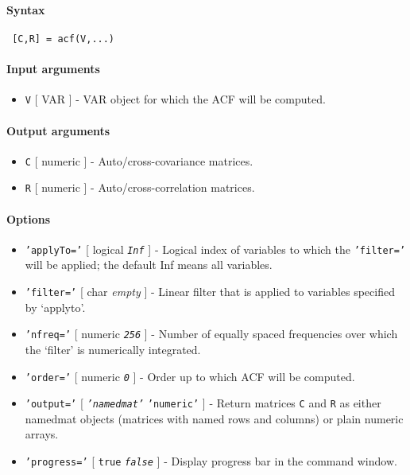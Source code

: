 


	\paragraph{Syntax}
 
 \begin{verbatim}
 [C,R] = acf(V,...)
 \end{verbatim}
 
 \paragraph{Input arguments}
 
 \begin{itemize}
 \item
   \texttt{V} {[} VAR {]} - VAR object for which the ACF will be
   computed.
 \end{itemize}
 
 \paragraph{Output arguments}
 
 \begin{itemize}
 \item
   \texttt{C} {[} numeric {]} - Auto/cross-covariance matrices.
 \item
   \texttt{R} {[} numeric {]} - Auto/cross-correlation matrices.
 \end{itemize}
 
 \paragraph{Options}
 
 \begin{itemize}
 \item
   \texttt{'applyTo='} {[} logical \textbar{} \emph{\texttt{Inf}} {]} -
   Logical index of variables to which the \texttt{'filter='} will be
   applied; the default Inf means all variables.
 \item
   \texttt{'filter='} {[} char \textbar{} \emph{empty} {]} - Linear
   filter that is applied to variables specified by `applyto'.
 \item
   \texttt{'nfreq='} {[} numeric \textbar{} \emph{\texttt{256}} {]} -
   Number of equally spaced frequencies over which the `filter' is
   numerically integrated.
 \item
   \texttt{'order='} {[} numeric \textbar{} \emph{\texttt{0}} {]} - Order
   up to which ACF will be computed.
 \item
   \texttt{'output='} {[} \emph{\texttt{'namedmat'}} \textbar{}
   \texttt{'numeric'} {]} - Return matrices \texttt{C} and \texttt{R} as
   either namedmat objects (matrices with named rows and columns) or
   plain numeric arrays.
 \item
   \texttt{'progress='} {[} \texttt{true} \textbar{}
   \emph{\texttt{false}} {]} - Display progress bar in the command
   window.
 \end{itemize}
 
